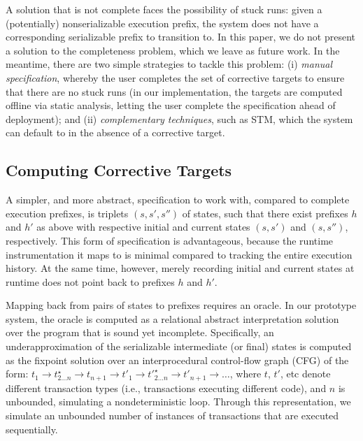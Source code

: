 A solution that is not complete faces the possibility of stuck runs: given a (potentially) nonserializable execution prefix, the system does not have a corresponding serializable prefix to transition to. In this paper, we do not present a solution to the completeness problem, which we leave as future work. In the meantime, there are two simple strategies to tackle this problem: (i) \emph{manual specification}, whereby the user completes the set of corrective targets to ensure that there are no stuck runs (in our implementation, the targets are computed offline via static analysis, letting the user complete the specification ahead of deployment); and (ii) \emph{complementary techniques}, such as STM, which the system can default to in the absence of a corrective target.


\subsection{Computing Corrective Targets}

A simpler, and more abstract, specification to work with, compared to complete execution prefixes, is triplets $(s,s',s'')$ of states, such that there exist prefixes $h$ and $h'$ as above with respective initial and current states $(s,s')$ and $(s,s'')$, respectively. This form of specification is advantageous, because the runtime instrumentation it maps to is minimal compared to tracking the entire execution history. At the same time, however, merely recording initial and current states at runtime does not point back to prefixes $h$ and $h'$.

Mapping back from pairs of states to prefixes requires an oracle. In our prototype system, the oracle is computed as a relational abstract interpretation solution over the program that is sound yet incomplete. Specifically, an underapproximation of the serializable intermediate (or final) states is computed as the fixpoint solution over an interprocedural control-flow graph (CFG) of the form: 
	$t_1 \rightarrow t^\star_{2 \ldots n} \rightarrow t_{n+1} \rightarrow t'_1 \rightarrow t'^\star_{2 \ldots n} \rightarrow t'_{n+1} \rightarrow \ldots$,
where $t$, $t'$, etc denote different transaction types (i.e., transactions executing different code), and $n$ is unbounded, simulating a nondeterministic loop. Through this representation, we simulate an unbounded number of instances of transactions that are executed sequentially.

